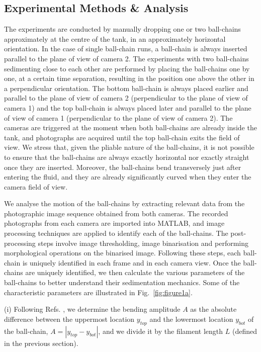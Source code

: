 \documentclass{article}
\begin{document}
\subsection{Experimental Methods \& Analysis} \label{Exp_methods}
The experiments are conducted by manually dropping one or two ball-chains approximately at the centre of the tank,  in an approximately horizontal orientation. In the case of single ball-chain runs, a ball-chain is always inserted parallel to the plane of view of camera 2. The experiments with two ball-chains sedimenting close to each other are performed by placing the ball-chains one by one, at a certain time separation, resulting in the position one above the other in a perpendicular orientation. The bottom ball-chain is always placed earlier and parallel to the plane of view of camera 2 (perpendicular to the plane of view of camera 1) and the top ball-chain is always placed later and parallel to the plane of view of camera 1 (perpendicular to the plane of view of camera 2). The cameras are triggered at the moment when both ball-chains are already %
inside the tank, and photographs are acquired until the top ball-chain exits the field of view. We stress that, given the pliable nature of the ball-chains, it is not %
possible to ensure that the ball-chains are always exactly horizontal nor exactly straight once they are inserted. Moreover, the ball-chains %
bend transversely %
just after
entering the fluid, and they are already significantly curved when they enter the camera field of view. 


We analyse the motion of the ball-chains by extracting relevant data from the photographic image sequence obtained from both cameras. The recorded photographs from each camera are imported into MATLAB, and image processing techniques are applied %
to identify each of the ball-chains. The post-processing steps involve image thresholding, image binarisation and performing morphological operations on the binarised image. Following these steps, each ball-chain is uniquely identified in each frame and in each camera view. Once the ball-chains are uniquely identified, we then calculate the various parameters of the ball-chains to better understand their sedimentation mechanics. Some of the characteristic parameters are illustrated in Fig.~\ref{fig:figure1a}. %

(i) Following Refs. \cite{lagomarsino2005hydrodynamic,bukowicki2018different}, we determine the bending amplitude $A$ as the absolute difference between the %
uppermost location $y_{top}$ and the %
lowermost location $y_{bot}$ of the ball-chain, $A = |y_{top} - y_{bot}|$, and we divide it by the filament length $L$ (defined in the previous section). %
\end{document}
